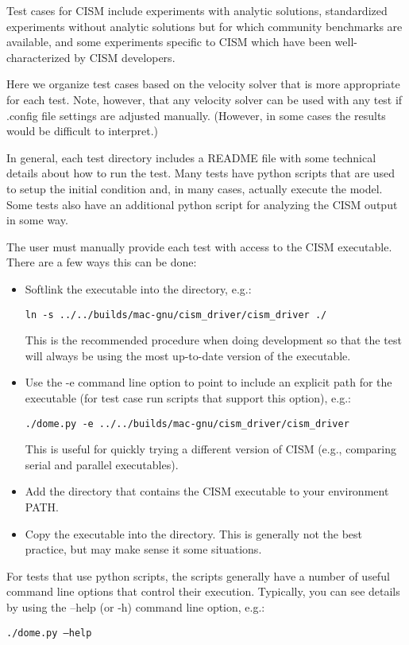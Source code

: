 
\label{ch:tests}

Test cases for CISM include experiments with analytic solutions, standardized experiments
without analytic solutions but for which community benchmarks are available, and
some experiments specific to CISM which have been well-characterized by CISM developers.

Here we organize test cases based on the velocity solver that is more appropriate
for each test.  Note, however, that any velocity solver can be used with any test
if .config file settings are adjusted manually.  (However, in some cases the results
would be difficult to interpret.)

In general, each test directory includes a README file with some technical details 
about how to run the test.  Many tests have python scripts that are used to setup
the initial condition and, in many cases, actually execute the model.  Some tests
also have an additional python script for analyzing the CISM output in some way.

The user must manually provide each test with access to the CISM executable.
There are a few ways this can be done:

\begin{itemize}
  \item Softlink the executable into the directory, e.g.:

        \texttt{ln -s ../../builds/mac-gnu/cism\_driver/cism\_driver ./}

        This is the recommended procedure when doing development so that the test
        will always be using the most up-to-date version of the executable.

  \item Use the -e command line option to point to include an explicit path for the executable (for test case run scripts that support this option), e.g.:

        \texttt{./dome.py -e ../../builds/mac-gnu/cism\_driver/cism\_driver}

        This is useful for quickly trying a different version of CISM (e.g., comparing 
        serial and parallel executables).

  \item Add the directory that contains the CISM executable to your environment PATH.

  \item Copy the executable into the directory.  This is generally not the best practice,
        but may make sense it some situations.
\end{itemize}

For tests that use python scripts, the scripts generally have a number of useful
command line options that control their execution.  Typically, you can see details 
by using the --help (or -h) command line option, e.g.:

\texttt{./dome.py --help}








